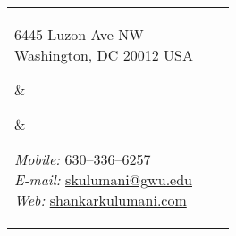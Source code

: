 \newlength{\rcollength}\setlength{\rcollength}{1.8in}%
\newlength{\spacewidth}\setlength{\spacewidth}{20pt}
{}
\begin{tabular}[t]{@{}p{\textwidth-\rcollength-\spacewidth}@{}p{\spacewidth}@{}p{\rcollength}}%

\parbox{\textwidth-\rcollength-\spacewidth}{%
6445 Luzon Ave NW\\
Washington, DC 20012 USA}
&
\parbox[m][2\baselineskip]{\spacewidth}{} &

\parbox{\rcollength}{%
\textit{Mobile:} 630--336--6257 \\
\textit{E-mail:} \href{mailto:skulumani@gwu.edu}{skulumani@gwu.edu} \\
\textit{Web: } \href{https://shankarkulumani.com}{shankarkulumani.com}}

\end{tabular}
